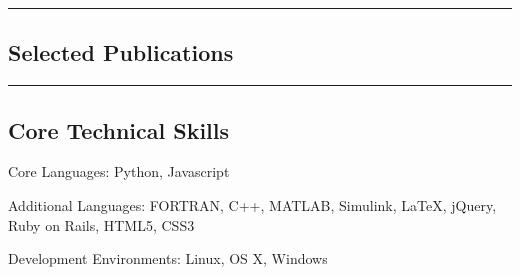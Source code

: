 \documentclass[10pt,letterpaper]{article}
\newenvironment{indentsection}[1]%
{\begin{list}{}%
	{\setlength{\leftmargin}{#1}}%
	\item[]%
}
{\end{list}}
\begin{document}
\hrule
\vspace{-0.4em}
\subsection*{Selected Publications}

\nocite{*}
\renewcommand{\section}[2]{}%



\hrule
\vspace{-0.4em}
\subsection*{Core Technical Skills}

\begin{indentsection}{\parindent}
\begin{description*}
	\item[Core Languages:]
	Python, Javascript
	\item[Additional Languages:]
	FORTRAN, C++, MATLAB, Simulink, \LaTeX, jQuery, Ruby on Rails, HTML5, CSS3
	\item[Development Environments:]
	Linux, OS X, Windows
\end{description*}
\end{indentsection}
\end{document}
